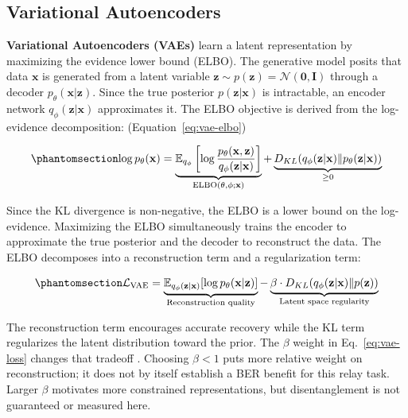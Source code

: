 \subsection{Variational Autoencoders}\label{sec:variational-autoencoders}

\textbf{Variational Autoencoders (VAEs)} \cite{KingmaWelling2014VAE} learn a latent representation by maximizing the evidence lower bound (ELBO). The generative model posits that data \(\mathbf{x}\) is generated from a latent variable \(\mathbf{z} \sim p(\mathbf{z}) = \mathcal{N}(\mathbf{0}, \mathbf{I})\) through a decoder \(p_\theta(\mathbf{x} | \mathbf{z})\). Since the true posterior \(p(\mathbf{z} | \mathbf{x})\) is intractable, an encoder network \(q_\phi(\mathbf{z} | \mathbf{x})\) approximates it. The ELBO objective is derived from the log-evidence decomposition: (Equation~\ref{eq:vae-elbo})

\begin{equation}\protect\phantomsection\label{eq:vae-elbo}{\log p_\theta(\mathbf{x}) = \underbrace{\mathbb{E}_{q_\phi}\left[\log \frac{p_\theta(\mathbf{x}, \mathbf{z})}{q_\phi(\mathbf{z} | \mathbf{x})}\right]}_{\text{ELBO}(\theta, \phi; \mathbf{x})} + \underbrace{D_{KL}(q_\phi(\mathbf{z} | \mathbf{x}) \| p_\theta(\mathbf{z} | \mathbf{x}))}_{\geq 0}
}\end{equation}

Since the KL divergence is non-negative, the ELBO is a lower bound on the log-evidence. Maximizing the ELBO simultaneously trains the encoder to approximate the true posterior and the decoder to reconstruct the data. The ELBO decomposes into a reconstruction term and a regularization term:

\begin{equation}\protect\phantomsection\label{eq:vae-loss}{\mathcal{L}_{\text{VAE}} = \underbrace{\mathbb{E}_{q_\phi(\mathbf{z}|\mathbf{x})}[\log p_\theta(\mathbf{x}|\mathbf{z})]}_{\text{Reconstruction quality}} - \underbrace{\beta \cdot D_{KL}(q_\phi(\mathbf{z}|\mathbf{x}) \| p(\mathbf{z}))}_{\text{Latent space regularity}}
}\end{equation}

The reconstruction term encourages accurate recovery while the KL term regularizes the latent distribution toward the prior. The $\beta$ weight in Eq.~\eqref{eq:vae-loss} changes that tradeoff \cite{Higgins2017betaVAE}. Choosing $\beta<1$ puts more relative weight on reconstruction; it does not by itself establish a BER benefit for this relay task. Larger $\beta$ motivates more constrained representations, but disentanglement is not guaranteed or measured here.

